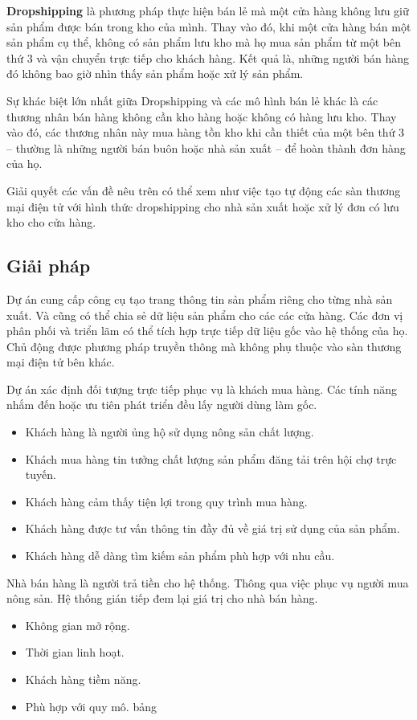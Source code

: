 \documentclass[11pt]{report}
\begin{document}
	\textbf{Dropshipping} là phương pháp thực hiện bán lẻ mà một cửa hàng không lưu giữ sản phẩm được bán trong kho của mình. Thay vào đó, khi một cửa hàng bán một sản phẩm cụ thể, không có sản phẩm lưu kho mà họ mua sản phẩm từ một bên thứ 3 và vận chuyển trực tiếp cho khách hàng. Kết quả là, những người bán hàng đó không bao giờ nhìn thấy sản phẩm hoặc xử lý sản phẩm.
	
	Sự khác biệt lớn nhất giữa Dropshipping và các mô hình bán lẻ khác là các thương nhân bán hàng không cần kho hàng hoặc không có hàng lưu kho. Thay vào đó, các thương nhân này mua hàng tồn kho khi cần thiết của một bên thứ 3 – thường là những người bán buôn hoặc nhà sản xuất – để hoàn thành đơn hàng của họ.
	
	Giải quyết các vấn đề nêu trên có thể xem như việc tạo tự động các sàn thương mại điện tử với hình thức dropshipping cho nhà sản xuất hoặc xử lý đơn có lưu kho cho cửa hàng.
	
	
	\subsection*{Giải pháp}
	
	Dự án cung cấp công cụ tạo trang thông tin sản phẩm riêng cho từng nhà sản xuất. Và cũng có thể chia sẻ dữ liệu sản phẩm cho các các cửa hàng. Các đơn vị phân phối và triển lãm có thể tích hợp trực tiếp dữ liệu gốc vào hệ thống của họ. Chủ động được phương pháp truyền thông mà không phụ thuộc vào sàn thương mại điện tử bên khác.
	
	Dự án xác định đối tượng trực tiếp phục vụ là khách mua hàng. Các tính năng nhắm đến hoặc ưu tiên phát triển đều lấy người dùng làm gốc.
	
	\begin{itemize}
		\item Khách hàng là người ủng hộ sử dụng nông sản chất lượng.
		\item Khách mua hàng tin tưởng chất lượng sản phẩm đăng tải trên hội chợ trực tuyến.
		\item Khách hàng cảm thấy tiện lợi trong quy trình mua hàng.
		\item Khách hàng được tư vấn thông tin đầy đủ về giá trị sử dụng của sản phẩm.
		\item Khách hàng dễ dàng tìm kiếm sản phẩm phù hợp với nhu cầu.
	\end{itemize}
	Nhà bán hàng là người trả tiền cho hệ thống. Thông qua việc phục vụ người mua nông sản. Hệ thống gián tiếp đem lại giá
	trị cho nhà bán hàng.
	\begin{itemize}
		\item Không gian mở rộng.
		\item Thời gian linh hoạt.
		\item Khách hàng tiềm năng.
		\item Phù hợp với quy mô.
		bảng
	\end{itemize}
	
\end{document}
